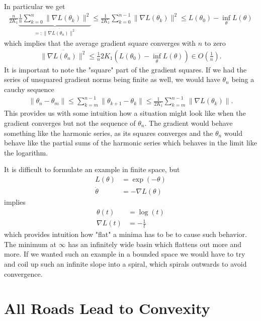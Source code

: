 In particular we get
%
\begin{align*}
	\tfrac{n}{2K_1}
	\underbrace{\tfrac{1}{n} \sum_{k=0}^n \|\nabla L(\theta_k)\|^2}_{
		=: \overline{\|\nabla L(\theta_n)\|^2}
	}
	\le \tfrac{1}{2K_1}\sum_{k=0}^{n-1} \|\nabla L(\theta_k)\|^2 
	\le L(\theta_0) - \inf_\theta L(\theta)
\end{align*}
%
which implies that the average gradient square converges with \(n\) to zero
%
\begin{align*}
	\overline{\|\nabla L(\theta_n)\|^2}
	\le \tfrac{1}{n}2 K_1 (L(\theta_0) - \inf_\theta L(\theta)) \in O(\tfrac{1}{n}).
\end{align*}
%
It is important to note the "square" part of the gradient squares. If we had the
series of unsquared gradient norms being finite as well, we would have
\(\theta_n\) being a cauchy sequence
%
\begin{align*}
	\|\theta_n - \theta_m \|
	\le \sum_{k=m}^{n-1} \|\theta_{k+1} - \theta_k\|
	\le \tfrac{1}{2K_1} \sum_{k=m}^{n-1} \|\nabla L(\theta_k)\|.
\end{align*}
%
This provides us with some intuition how a situation might look like when the
gradient converges but not the sequence of \(\theta_n\). The gradient would
behave something like the harmonic series, as its squares converges and the
\(\theta_n\) would behave like the partial sums of the harmonic series which
behaves in the limit like the logarithm.

It is difficult to formulate an example in finite space, but
%
\begin{align*}
	L(\theta) &= \exp(-\theta) \\
	\dot{\theta} &= -\nabla L(\theta)
\end{align*}
%
implies
%
\begin{align*}
	\theta(t) &= \log(t)\\
	\nabla L(t) &= -\tfrac1t
\end{align*}
%
which provides intuition how "flat" a minima has to be to cause such behavior.
The minimum at \(\infty\) has an infinitely wide basin which flattens out
more and more. If we wanted such an example in a bounded space we would have
to try and coil up such an infinite slope into a spiral, which spirals outwards
to avoid convergence.

\section{All Roads Lead to Convexity}

